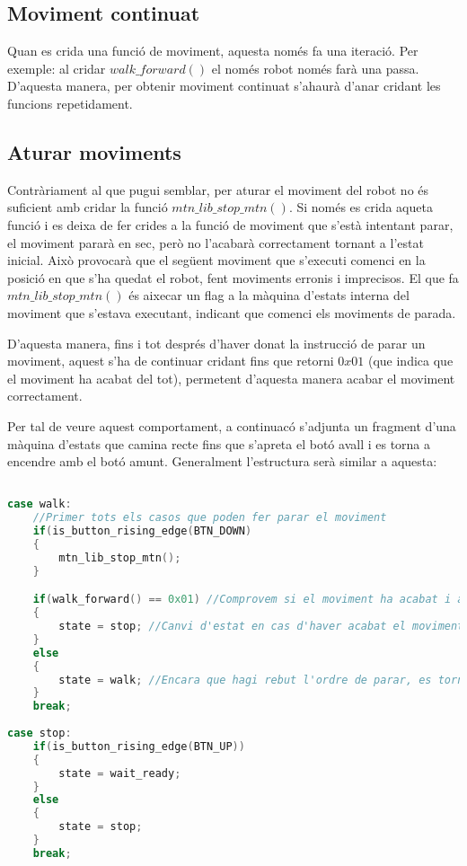\documentclass{article}
\begin{document}
\subsection{Moviment continuat}
Quan es crida una funció de moviment, aquesta només fa una iteració. Per exemple: al cridar $walk\_forward()$ el només robot només farà una passa. D'aquesta manera, per obtenir moviment continuat s'ahaurà d'anar cridant les funcions repetidament. 

\subsection{Aturar moviments}
Contràriament al que pugui semblar, per aturar el moviment del robot no és suficient amb cridar la funció $mtn\_lib\_stop\_mtn()$. Si només es crida aqueta funció i es deixa de fer crides a la funció de moviment que s'està intentant parar, el moviment pararà en sec, però no l'acabarà correctament tornant a l'estat inicial. Això provocarà que el següent moviment que s'executi comenci en la posició en que s'ha quedat el robot, fent moviments erronis i imprecisos. El que fa $mtn\_lib\_stop\_mtn()$ és aixecar un flag a la màquina d'estats interna del moviment que s'estava executant, indicant que comenci els moviments de parada. 

D'aquesta manera, fins i tot després d'haver donat la instrucció de parar un moviment, aquest s'ha de continuar cridant fins que retorni $0x01$ (que indica que el moviment ha acabat del tot), permetent d'aquesta manera acabar el moviment correctament. 

Per tal de veure aquest comportament, a continuacó s'adjunta un fragment d'una màquina d'estats que camina recte fins que s'apreta el botó avall i es torna a encendre amb el botó amunt. Generalment l'estructura serà similar a aquesta:

\begin{lstlisting}[language=c]

case walk: 	
	//Primer tots els casos que poden fer parar el moviment
	if(is_button_rising_edge(BTN_DOWN)
	{
		mtn_lib_stop_mtn(); 
	}

	if(walk_forward() == 0x01) //Comprovem si el moviment ha acabat i alhora cridem la funcló de moviment
	{
		state = stop; //Canvi d'estat en cas d'haver acabat el moviment
	}
	else
	{
		state = walk; //Encara que hagi rebut l'ordre de parar, es torna a executar tot l'estat fins que el moviment pari.
	}
	break;	      
	  
case stop: 
	if(is_button_rising_edge(BTN_UP))
	{
		state = wait_ready;
	}
	else
	{
		state = stop;
	}
	break;
\end{lstlisting}
\end{document}
